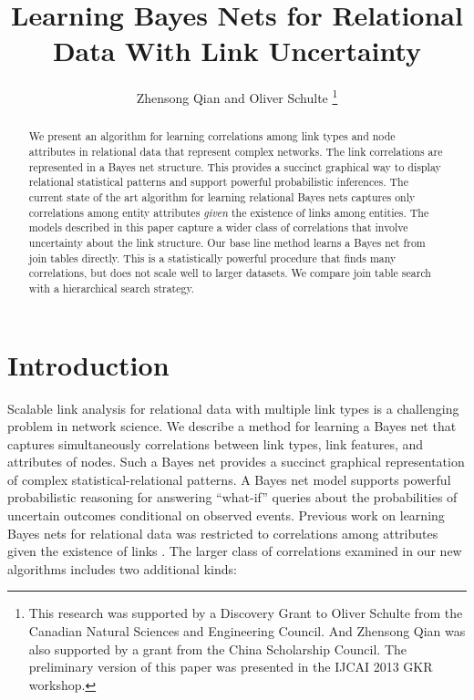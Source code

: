 \documentclass[runningheads,a4paper]{llncs}
\begin{document}
\mainmatter  %

\title{Learning Bayes Nets for Relational Data With Link Uncertainty}


\author{Zhensong Qian and Oliver Schulte
\thanks{
This research was supported by a Discovery Grant to Oliver Schulte from the Canadian Natural Sciences and Engineering Council. 
And Zhensong Qian was also supported by a grant from the China Scholarship Council.
The preliminary version of this paper was presented in the IJCAI 2013 GKR workshop.
}
 }



\maketitle


\begin{abstract} 
We present an algorithm for learning correlations among link types and node attributes in relational data that represent complex networks. 
The link correlations are represented in a Bayes net structure. This provides a succinct graphical way to display relational statistical patterns and support powerful probabilistic inferences. The current state of the art algorithm for learning relational Bayes nets captures only correlations among entity attributes {\em given} the existence of links among entities. The models described in this paper capture a wider class of correlations that involve uncertainty about the link structure. Our base line method learns a Bayes net from join tables directly. This is  a statistically powerful procedure that finds many correlations, but does not scale well to larger datasets. We compare join table search with a hierarchical search strategy.
\end{abstract}


\section{Introduction} 
Scalable link analysis for relational data with multiple link types is a challenging problem in network science.
 We describe a method for learning a Bayes net that captures simultaneously correlations between link types, link features, and attributes of nodes. Such a Bayes net provides a succinct graphical representation of complex statistical-relational patterns. A  Bayes net model supports powerful probabilistic reasoning for answering ``what-if'' queries about the probabilities of uncertain outcomes conditional on observed events.
Previous work on learning Bayes nets for relational data was restricted to correlations among attributes given the existence of links \cite{Schulte2012}. The larger class of correlations examined in our new algorithms includes two additional kinds:
\end{document}
